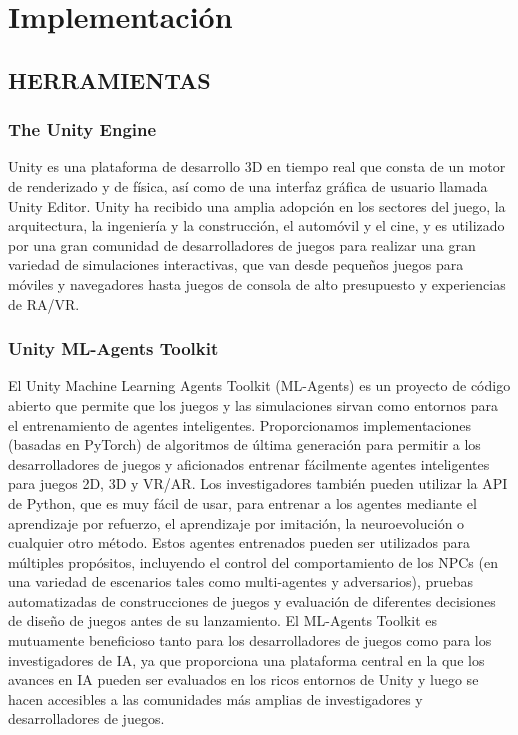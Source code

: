 \chapter{Implementación}\label{chapter:implementation}


\section{HERRAMIENTAS}

\subsection{The Unity Engine}

Unity es una plataforma de desarrollo 3D en tiempo real que consta de un motor de renderizado y de física, así como de una interfaz gráfica de usuario llamada Unity Editor. Unity ha recibido una amplia adopción en los sectores del juego, la arquitectura, la ingeniería y la construcción, el automóvil y el cine, y es utilizado por una gran comunidad de desarrolladores de juegos para realizar una gran variedad de simulaciones interactivas, que van desde pequeños juegos para móviles y navegadores hasta juegos de consola de alto presupuesto y experiencias de RA/VR.

\subsection{Unity ML-Agents Toolkit}

El Unity Machine Learning Agents Toolkit (ML-Agents) es un proyecto de código abierto que permite que los juegos y las simulaciones sirvan como entornos para el entrenamiento de agentes inteligentes. Proporcionamos implementaciones (basadas en PyTorch) de algoritmos de última generación para permitir a los desarrolladores de juegos y aficionados entrenar fácilmente agentes inteligentes para juegos 2D, 3D y VR/AR. Los investigadores también pueden utilizar la API de Python, que es muy fácil de usar, para entrenar a los agentes mediante el aprendizaje por refuerzo, el aprendizaje por imitación, la neuroevolución o cualquier otro método. Estos agentes entrenados pueden ser utilizados para múltiples propósitos, incluyendo el control del comportamiento de los NPCs (en una variedad de escenarios tales como multi-agentes y adversarios), pruebas automatizadas de construcciones de juegos y evaluación de diferentes decisiones de diseño de juegos antes de su lanzamiento. El ML-Agents Toolkit es mutuamente beneficioso tanto para los desarrolladores de juegos como para los investigadores de IA, ya que proporciona una plataforma central en la que los avances en IA pueden ser evaluados en los ricos entornos de Unity y luego se hacen accesibles a las comunidades más amplias de investigadores y desarrolladores de juegos.


